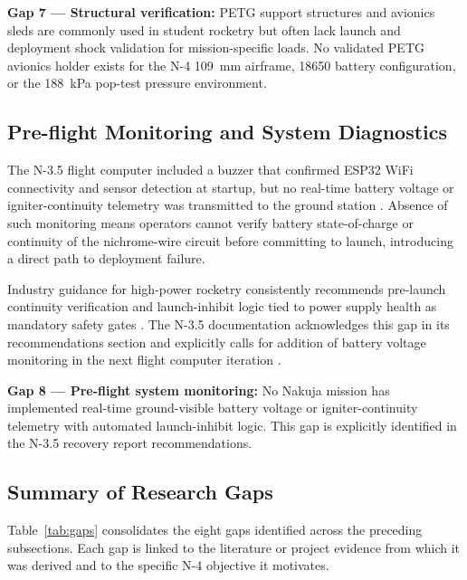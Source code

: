 \textbf{Gap 7 --- Structural verification:} PETG support structures and avionics sleds are commonly used in student rocketry but often lack launch and deployment shock validation for mission-specific loads. No validated PETG avionics holder exists for the N-4 109~mm airframe, 18650 battery configuration, or the 188~kPa pop-test pressure environment.

\subsection{Pre-flight Monitoring and System Diagnostics}

The N-3.5 flight computer included a buzzer that confirmed ESP32 WiFi connectivity and sensor detection at startup, but no real-time battery voltage or igniter-continuity telemetry was transmitted to the ground station \cite{n3p5_recovery_report}. Absence of such monitoring means operators cannot verify battery state-of-charge or continuity of the nichrome-wire circuit before committing to launch, introducing a direct path to deployment failure.

Industry guidance for high-power rocketry consistently recommends pre-launch continuity verification and launch-inhibit logic tied to power supply health as mandatory safety gates \cite{high_g_electronics}. The N-3.5 documentation acknowledges this gap in its recommendations section and explicitly calls for addition of battery voltage monitoring in the next flight computer iteration \cite{n3p5_recovery_report}.

\textbf{Gap 8 --- Pre-flight system monitoring:} No Nakuja mission has implemented real-time ground-visible battery voltage or igniter-continuity telemetry with automated launch-inhibit logic. This gap is explicitly identified in the N-3.5 recovery report recommendations.

\subsection{Summary of Research Gaps}

Table~\ref{tab:gaps} consolidates the eight gaps identified across the preceding subsections. Each gap is linked to the literature or project evidence from which it was derived and to the specific N-4 objective it motivates.

